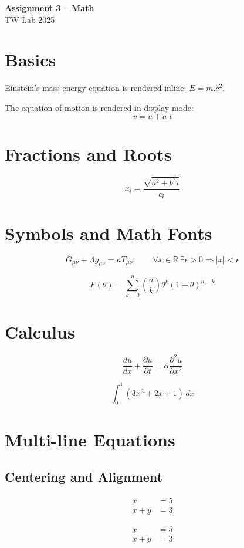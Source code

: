 \documentclass[12pt,a4paper]{article}
\begin{document}
\begin{center}
    {\LARGE\bfseries Assignment 3 -- Math}\\
    TW Lab 2025
\end{center}

\section{Basics}
Einstein's mass-energy equation is rendered inline:
\(E=m.c^2\).

The equation of motion is rendered in display mode:
\[
v=u+a.t
\]

\section{Fractions and Roots}
\[
x_i=\frac{\sqrt{a^2+b^2 i}}{c_i}
\]

\section{Symbols and Math Fonts}
\[
G_{\mu\nu}+\Lambda g_{\mu\nu}=\kappa T_{\mu\nu},
\qquad
\forall x\in\mathbb{R}\ \exists\epsilon>0
\Rightarrow |x|<\epsilon
\]

\[
F(\theta)=\sum_{k=0}^{n}
\binom{n}{k}\theta^k(1-\theta)^{n-k}
\]

\section{Calculus}
\[
\frac{du}{dx}+\frac{\partial u}{\partial t}
=\alpha\frac{\partial^2u}{\partial x^2}
\]

\[
\int_0^1(3x^2+2x+1)\,dx
\]

\section{Multi-line Equations}

\subsection{Centering and Alignment}
\begin{align}
x &= 5 \\
x+y &= 3
\end{align}

\begin{align}
x &= 5 \\
x+y &= 3
\end{align}
\end{document}
